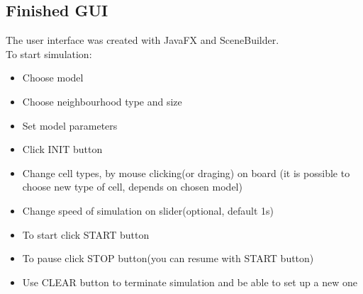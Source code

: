 \documentclass[a4paper, 11pt]{article}
\begin{document}
\subsection{Finished GUI}
The user interface was created with JavaFX and SceneBuilder.\\
To start simulation:
\begin{itemize}
\item Choose model
\item Choose neighbourhood type and size
\item Set model parameters
\item Click INIT button
\item Change cell types, by mouse clicking(or draging) on board (it is possible to choose new type of cell, depends on chosen model)
\item Change speed of simulation on slider(optional, default 1s)
\item To start click START button
\item To pause click STOP button(you can resume with START button)
\item Use CLEAR button to terminate simulation and be able to set up a new one

\end{itemize}
\end{document}
